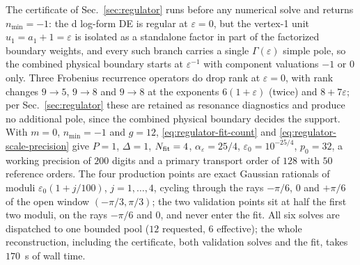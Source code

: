 \documentclass[11pt,a4paper]{article}
\begin{document}
The certificate of Sec.~\ref{sec:regulator} runs before any numerical solve and returns
$n_{\min}=-1$: the d log-form DE is regular at $\varepsilon=0$, but the vertex-1 unit
$u_1=a_1+1=\varepsilon$ is isolated as a standalone factor in part of the factorized boundary
weights, and every such branch carries a single $\Gamma(\varepsilon)$ simple pole, so the
combined physical boundary starts at $\varepsilon^{-1}$ with component valuations $-1$ or
$0$ only. Three Frobenius recurrence operators do drop rank at $\varepsilon=0$, with rank
changes $9\to5$, $9\to8$ and $9\to8$ at the exponents $6(1+\varepsilon)$ (twice) and
$8+7\varepsilon$; per
Sec.~\ref{sec:regulator} these are retained as resonance diagnostics and produce no additional
pole, since the combined physical boundary decides the support. With $m=0$, $n_{\min}=-1$ and
$g=12$, \eqref{eq:regulator-fit-count} and \eqref{eq:regulator-scale-precision} give
$P=1$, $\Delta=1$, $N_{\rm fit}=4$, $\alpha_\varepsilon=25/4$, $\varepsilon_0=10^{-25/4}$,
$p_0=32$, a working
precision of $200$ digits and a primary transport order of $128$ with $50$ reference orders.
The four production points are exact Gaussian rationals of moduli
$\varepsilon_0(1+j/100)$, $j=1,\ldots,4$, cycling through the rays $-\pi/6$, $0$ and $+\pi/6$ of the
open window $(-\pi/3,\pi/3)$; the two validation points sit at half the first two moduli, on the
rays $-\pi/6$ and $0$, and never enter the fit. All six solves are dispatched to one bounded pool
($12$ requested, $6$ effective); the whole reconstruction, including the certificate, both
validation solves and the fit, takes $170$~s of wall time.
\end{document}
